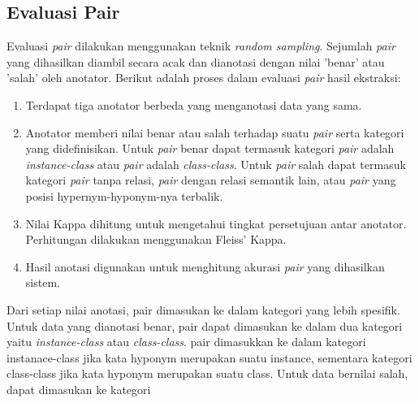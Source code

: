 \subsection{Evaluasi Pair}
Evaluasi \textit{pair} dilakukan menggunakan teknik \textit{random sampling}. Sejumlah \textit{pair} yang dihasilkan diambil secara acak dan dianotasi dengan nilai 'benar' atau 'salah' oleh anotator. Berikut adalah proses dalam evaluasi \textit{pair} hasil ekstraksi:
\begin{enumerate}
  \item Terdapat tiga anotator berbeda yang menganotasi data yang sama. 
  \item Anotator memberi nilai benar atau salah terhadap suatu \textit{pair} serta kategori yang didefinisikan. Untuk \textit{pair} benar dapat termasuk kategori \textit{pair} adalah \textit{instance-class} atau \textit{pair} adalah \textit{class-class}. Untuk \textit{pair} salah dapat termasuk kategori \textit{pair} tanpa relasi, \textit{pair} dengan relasi semantik lain, atau \textit{pair} yang posisi hypernym-hyponym-nya terbalik. 
  \item Nilai Kappa dihitung untuk mengetahui tingkat persetujuan antar anotator. Perhitungan dilakukan menggunakan Fleiss' Kappa.
  \item Hasil anotasi digunakan untuk menghitung akurasi \textit{pair} yang dihasilkan sistem.
\end{enumerate}

Dari setiap nilai anotasi, pair dimasukan ke dalam kategori yang lebih spesifik. Untuk data yang dianotasi benar, pair dapat dimasukan ke dalam dua kategori yaitu \textit{instance-class} atau \textit{class-class}. pair dimasukkan ke dalam kategori instanace-class jika kata hyponym merupakan suatu instance, sementara kategori class-class jika kata hyponym merupakan suatu class. Untuk data bernilai salah, dapat dimasukan ke kategori 
